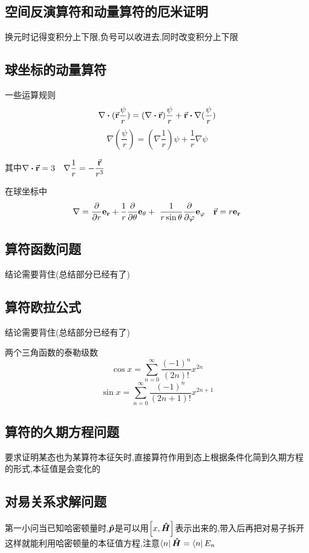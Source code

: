 \documentclass{article}
\begin{document}
        \subsection{空间反演算符和动量算符的厄米证明}
            换元时记得变积分上下限,负号可以收进去,同时改变积分上下限
        \subsection{球坐标的动量算符}
            一些运算规则
            $$ \nabla \vdot (\va{r} \frac{\psi}{r})  =  (\nabla \vdot \va{r}) \frac{\psi}{r} + \va{r} \vdot \nabla(\frac{\psi}{r}) $$
            $$ \nabla (\frac{\psi}{r}) = (\nabla \frac{1}{r})\psi + \frac{1}{r} \nabla \psi $$
            
            其中$ \nabla \vdot \va{r} = 3 \quad \nabla \dfrac{1}{r} = - \dfrac{\va{r}}{r^{3}} $

            在球坐标中
            $$ \nabla =  \pdv{r} \vb{e_{r}} +  \frac{1}{r} \pdv{\theta} \vb{e_{\theta}} + \ \frac{1}{r \sin{\theta}} \pdv{\varphi} \vb{e_{\varphi}} \quad \va{r} = r \vb{e_{r}}  $$         
    
        \subsection{算符函数问题}
            结论需要背住(总结部分已经有了)
        \subsection{算符欧拉公式}
            结论需要背住(总结部分已经有了)
            \begin{formal}
                两个三角函数的泰勒级数
                $$ \cos{x} = \sum_{n=0}^{\infty} \frac{(-1)^{n}}{(2n)!} x^{2n} $$
                $$ \sin{x} = \sum_{n=0}^{\infty} \frac{(-1)^{n}}{(2n+1)!} x^{2n+1} $$
            \end{formal}
            
        
        \subsection{算符的久期方程问题}
            要求证明某态也为某算符本征矢时,直接算符作用到态上根据条件化简到久期方程的形式,本征值是会变化的
        \subsection{对易关系求解问题}
            第一小问当已知哈密顿量时,$\vu*{p}$是可以用$\comm{x}{\vu*{H}}$表示出来的,带入后再把对易子拆开这样就能利用哈密顿量的本征值方程,注意$ \bra{n} \vu*{H} = \bra{n} E_{n} $
\end{document}
